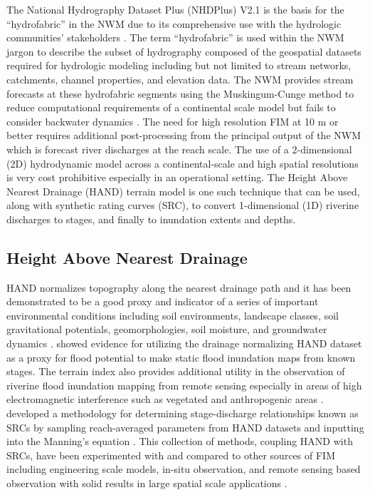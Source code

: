 \documentclass[draft]{dependencies/agujournal2019}
\begin{document}
The National Hydrography Dataset Plus (NHDPlus) V2.1 is the basis for the ``hydrofabric'' in the NWM due to its comprehensive use with the hydrologic communities' stakeholders \cite{mckay2012nhdplus,nhdplus2022vectors}. 
The term ``hydrofabric'' is used within the NWM jargon to describe the subset of hydrography composed of the geospatial datasets required for hydrologic modeling including but not limited to stream networks, catchments, channel properties, and elevation data. 
The NWM provides stream forecasts at these hydrofabric segments using the Muskingum-Cunge method to reduce computational requirements of a continental scale model but fails to consider backwater dynamics \cite{bedient2008hydrology,ponce1994variable,gochis2021wrf}.
The need for high resolution FIM at 10 m or better requires additional post-processing from the principal output of the NWM which is forecast river discharges at the reach scale.
The use of a 2-dimensional (2D) hydrodynamic model across a continental-scale and high spatial resolutions is very cost prohibitive especially in an operational setting.
The Height Above Nearest Drainage (HAND) terrain model is one such technique that can be used, along with synthetic rating curves (SRC), to convert 1-dimensional (1D) riverine discharges to stages, and finally to inundation extents and depths.
%
\subsection{Height Above Nearest Drainage}
%
HAND normalizes topography along the nearest drainage path and it has been demonstrated to be a good proxy and indicator of a series of important environmental conditions including soil environments, landscape classes, soil gravitational potentials, geomorphologies, soil moisture, and groundwater dynamics \cite{renno2008hand,nobre2011height}. 
 showed evidence for utilizing the drainage normalizing HAND dataset as a proxy for flood potential to make static flood inundation maps from known stages.
The terrain index also provides additional utility in the observation of riverine flood inundation mapping from remote sensing especially in areas of high electromagnetic interference such as vegetated and anthropogenic areas \cite{aristizabal2020high,shastry2019using,huang2017comparison,twele2016sentinel,aristizabal2021mapping}.
 developed a methodology for determining stage-discharge relationships known as SRCs by sampling reach-averaged parameters from HAND datasets and inputting into the Manning's equation \cite{gauckler1867etudes,manning1890flow}.
This collection of methods, coupling HAND with SRCs, have been experimented with and compared to other sources of FIM including engineering scale models, in-situ observation, and remote sensing based observation with solid results in large spatial scale applications \cite{godbout2019error,johnson2019integrated,garousi2019terrain,nobre2016hand,afshari2018comparison,zheng2018geoflood,teng2015rapid,teng2017flood,zhang2018comparative}.
%
\end{document}
